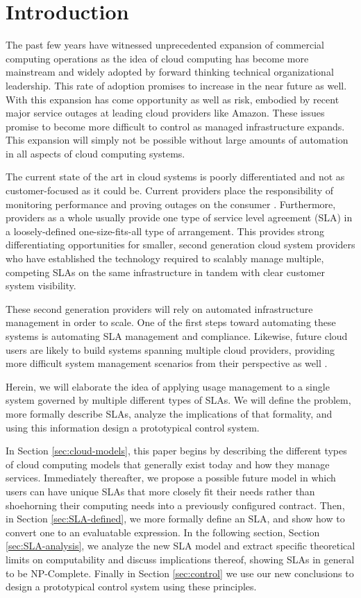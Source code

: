 \section{Introduction}
The past few years have witnessed unprecedented expansion of commercial computing operations as the idea of cloud computing has become more mainstream and widely adopted by forward thinking technical organizational leadership.  This rate of adoption promises to increase in the near future as well.  With this expansion has come opportunity as well as risk, embodied by recent major service outages at leading cloud providers like Amazon.  These issues promise to become more difficult to control as managed infrastructure expands.  This expansion will simply not be possible without large amounts of automation in all aspects of cloud computing systems.

The current state of the art in cloud systems is poorly differentiated and not as customer-focused as it could be.  Current providers place the responsibility of monitoring performance and proving outages on the consumer \cite{ctrl:amazon-cloud-watch}.  Furthermore, providers as a whole usually provide one type of service level agreement (SLA) in a loosely-defined one-size-fits-all type of arrangement.  This provides strong differentiating opportunities for smaller, second generation cloud system providers who have established the technology required to scalably manage multiple, competing SLAs on the same infrastructure in tandem with clear customer system visibility.

These second generation providers will rely on automated infrastructure management in order to scale.  One of the first steps toward automating these systems is automating SLA management and compliance.  Likewise, future cloud users are likely to build systems spanning multiple cloud providers, providing more difficult system management scenarios from their perspective as well \cite{ctrl:lamb-MCCCS}.

Herein, we will elaborate the idea of applying usage management to a single system governed by multiple different types of SLAs.  We will define the problem, more formally describe SLAs, analyze the implications of that formality, and using this information design a prototypical control system.

In Section \ref{sec:cloud-models}, this paper begins by describing the different types of cloud computing models that generally exist today and how they manage services.  Immediately thereafter, we propose a possible future model in which users can have unique SLAs that more closely fit their needs rather than shoehorning their computing needs into a previously configured contract.  Then, in Section \ref{sec:SLA-defined}, we more formally define an SLA, and show how to convert one to an evaluatable expression.  In the following section, Section \ref{sec:SLA-analysis}, we analyze the new SLA model and extract specific theoretical limits on computability and discuss implications thereof, showing SLAs in general to be NP-Complete.  Finally in Section \ref{sec:control} we use our new conclusions to design a prototypical control system using these principles.

